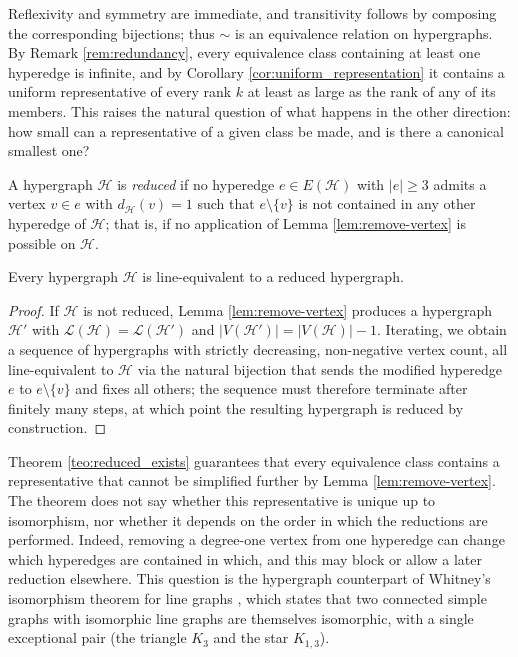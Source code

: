 \documentclass[12pt,reqno]{amsart}
\begin{document}
Reflexivity and symmetry are immediate, and transitivity follows by composing the corresponding bijections; thus $\sim$ is an equivalence relation on hypergraphs. By Remark \ref{rem:redundancy}, every equivalence class containing at least one hyperedge is infinite, and by Corollary \ref{cor:uniform_representation} it contains a uniform representative of every rank $k$ at least as large as the rank of any of its members. This raises the natural question of what happens in the other direction: how small can a representative of a given class be made, and is there a canonical smallest one?

\begin{definition}\label{def:reduced}
A hypergraph $\mathcal{H}$ is \textit{reduced} if no hyperedge $e \in E(\mathcal{H})$ with $|e| \geq 3$ admits a vertex $v \in e$ with $d_{\mathcal{H}}(v) = 1$ such that $e \setminus \{v\}$ is not contained in any other hyperedge of $\mathcal{H}$; that is, if no application of Lemma \ref{lem:remove-vertex} is possible on $\mathcal{H}$.
\end{definition}

\begin{theorem}\label{teo:reduced_exists}
Every hypergraph $\mathcal{H}$ is line-equivalent to a reduced hypergraph.
\end{theorem}
\begin{proof}
If $\mathcal{H}$ is not reduced, Lemma \ref{lem:remove-vertex} produces a hypergraph $\mathcal{H}'$ with $\mathcal{L}(\mathcal{H}) = \mathcal{L}(\mathcal{H}')$ and $|V(\mathcal{H}')| = |V(\mathcal{H})| - 1$. Iterating, we obtain a sequence of hypergraphs with strictly decreasing, non-negative vertex count, all line-equivalent to $\mathcal{H}$ via the natural bijection that sends the modified hyperedge $e$ to $e \setminus \{v\}$ and fixes all others; the sequence must therefore terminate after finitely many steps, at which point the resulting hypergraph is reduced by construction.
\end{proof}

Theorem \ref{teo:reduced_exists} guarantees that every equivalence class contains a representative that cannot be simplified further by Lemma \ref{lem:remove-vertex}. The theorem does not say whether this representative is unique up to isomorphism, nor whether it depends on the order in which the reductions are performed. Indeed, removing a degree-one vertex from one hyperedge can change which hyperedges are contained in which, and this may block or allow a later reduction elsewhere. This question is the hypergraph counterpart of Whitney's isomorphism theorem for line graphs \cite{line-1932}, which states that two connected simple graphs with isomorphic line graphs are themselves isomorphic, with a single exceptional pair (the triangle $K_3$ and the star $K_{1,3}$).
\end{document}

